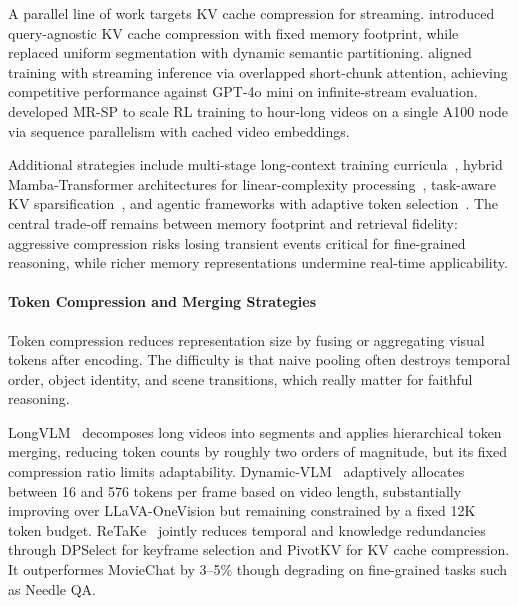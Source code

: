 \documentclass[10pt]{article} %
\begin{document}
A parallel line of work targets KV cache compression for streaming. \citet{Yang2025StreamMemQK} introduced query-agnostic KV cache compression with fixed memory footprint, while \citet{Chen2025StreamKVSV} replaced uniform segmentation with dynamic semantic partitioning. \citet{Xu2025StreamingVLMRU} aligned training with streaming inference via overlapped short-chunk attention, achieving competitive performance against GPT-4o mini on infinite-stream evaluation. \citet{Chen2025ScalingRT} developed MR-SP to scale RL training to hour-long videos on a single A100 node via sequence parallelism with cached video embeddings.

Additional strategies include multi-stage long-context training curricula~\citep{Xue2024LongVILASL}, hybrid Mamba-Transformer architectures for linear-complexity processing~\citep{Ren2025VambaUH}, task-aware KV sparsification~\citep{Qin2025TaskAwareKC, Qin2025VideoXL2TV}, and agentic frameworks with adaptive token selection~\citep{Yang2025StreamAgentTA}. The central trade-off remains between memory footprint and retrieval fidelity: aggressive compression risks losing transient events critical for fine-grained reasoning, while richer memory representations undermine real-time applicability.

\paragraph{Token Compression and Merging Strategies}

Token compression reduces representation size by fusing or aggregating visual tokens after encoding. The difficulty is that naive pooling often destroys temporal order, object identity, and scene transitions, which really matter for faithful reasoning.

LongVLM~\citep{Weng2024LongVLMEL} decomposes long videos into segments and applies hierarchical token merging, reducing token counts by roughly two orders of magnitude, but its fixed compression ratio limits adaptability. Dynamic-VLM~\citep{Wang2024DynamicVLMSD} adaptively allocates between 16 and 576 tokens per frame based on video length, substantially improving over LLaVA-OneVision but remaining constrained by a fixed 12K token budget. ReTaKe~\citep{Wang2024ReTaKeRT} jointly reduces temporal and knowledge redundancies through DPSelect for keyframe selection and PivotKV for KV cache compression. It outperformes MovieChat by 3--5\% though degrading on fine-grained tasks such as Needle QA.
\end{document}
